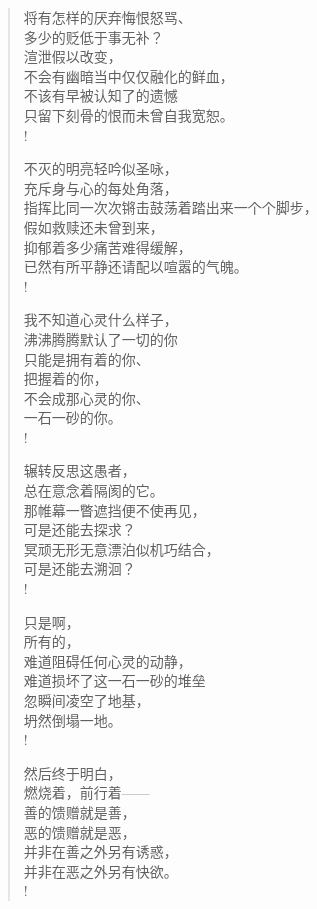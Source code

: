 \documentclass[UTF8, 12pt, a4paper]{ctexrep} %
\begin{document}
\begin{verse}
    将有怎样的厌弃悔恨怒骂、\\
    多少的贬低于事无补？\\
    渲泄假以改变，\\
    不会有幽暗当中仅仅融化的鲜血，\\
    不该有早被认知了的遗憾\\
    只留下刻骨的恨而未曾自我宽恕。\\!

    不灭的明亮轻吟似圣咏，\\
    充斥身与心的每处角落，\\
    指挥比同一次次锵击鼓荡着踏出来一个个脚步，\\
    假如救赎还未曾到来，\\
    抑郁着多少痛苦难得缓解，\\
    已然有所平静还请配以喧嚣的气魄。\\!

    我不知道心灵什么样子，\\
    沸沸腾腾默认了一切的你\\
    只能是拥有着的你、\\
    把握着的你，\\
    不会成那心灵的你、\\
    一石一砂的你。\\!

    辗转反思这愚者，\\
    总在意念着隔阂的它。\\
    那帷幕一瞥遮挡便不使再见，\\
    可是还能去探求？\\
    冥顽无形无意漂泊似机巧结合，\\
    可是还能去溯洄？\\!

    只是啊，\\
    所有的，\\
    难道阻碍任何心灵的动静，\\
    难道损坏了这一石一砂的堆垒\\
    忽瞬间凌空了地基，\\
    坍然倒塌一地。\\!

    然后终于明白，\\
    燃烧着，前行着——\\
    善的馈赠就是善，\\
    恶的馈赠就是恶，\\
    并非在善之外另有诱惑，\\
    并非在恶之外另有快欲。\\!

\end{verse}
\end{document}
